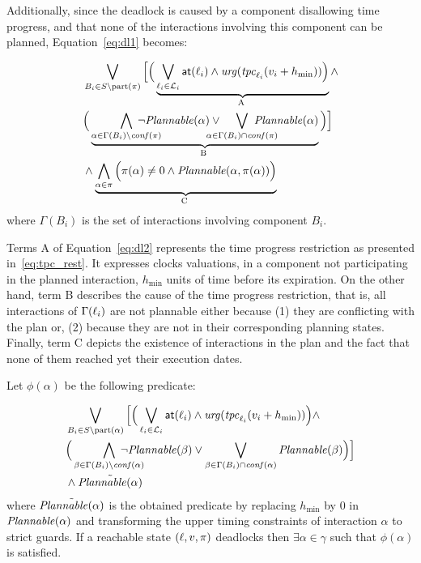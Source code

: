   Additionally, since the deadlock is caused by a component disallowing 
  time progress, and that none of the interactions involving this component
  can be planned, Equation~\ref{eq:dl1} becomes:
  
  \begin{equation}\label{eq:dl2}
  \begin{split}
    &\bigvee_{B_i\in S\setminus\p{\pi}}\Big[\Big(
    \underbrace{\bigvee_{\loc_i\in\Loc_i}\at{\loc_i}
  \wedge\urg(\tpc{\loc_i}(\val_i+h_{\min}))\Big)}_\text{\mytag{A}{A}}\wedge\\
  &\Big(\underbrace{\bigwedge_{\alpha\in\Gamma(B_i)\setminus\confl(\pi)}\hspace{-8mm}
    \neg\plntxt{\alpha}\vee\hspace{-5mm}\bigvee_{\alpha\in\Gamma(B_i)\cap\confl(\pi)}
\hspace{-8mm}\plntxt{\alpha}}_\text{\mytag{B}{B}}\Big)\Big]\\
&\wedge\underbrace{\bigwedge_{\alpha\in\pi}\Big(\pi(\alpha)\neq0\wedge
    \plnIntxt{\alpha}{\pi(\alpha)}\Big)}_\text{\mytag{C}{C}} 
  \end{split}
  \end{equation}
  where $\Gamma(B_i)$ is the set of interactions involving component $B_i$.

Terms A of Equation~\ref{eq:dl2} represents the time progress restriction as presented
in~\ref{eq:tpc_rest}. It expresses clocks valuations, in a component not participating 
in the planned interaction, $h_{\min}$ units of time before its expiration. On the other hand,
term B describes the cause of the time progress restriction, that is, all interactions
of $\Gamma(\ell_i)$ are not plannable either because (1) they are conflicting with the plan
or, (2) because they are not in their corresponding planning states.
Finally, term C depicts the existence of interactions in the plan and the fact that none of them
reached yet their execution dates.
 
\begin{theorem}\label{thm:dla}
  Let $\phi(\alpha)$ be the following predicate:

    \begin{equation}\label{eq:dla}
  \begin{split}
    &\bigvee_{B_i\in S\setminus\p{\alpha}}\Big[\Big(
    \bigvee_{\loc_i\in\Loc_i}\at{\loc_i}
  \wedge\urg(\tpc{\loc_i}(\val_i+h_{\min}))\Big)\wedge\\
  &\Big(\bigwedge_{\beta\in\Gamma(B_i)\setminus\confl(\alpha)}\hspace{-8mm}
  \neg\plntxt{\beta}\vee\bigvee_{\beta\in\Gamma(B_i)\cap\confl(\alpha)}
\plntxt{\beta}\Big)\Big]\\
&\wedge\tilde{\plntxt{\alpha}} 
  \end{split}
\end{equation}
  where $\tilde{\mathit{Plannable(\alpha)}}$ is the obtained predicate by replacing 
  $h_{\min}$ by 0 in $\mathit{Plannable(\alpha)}$ and transforming the upper 
  timing constraints of interaction $\alpha$ to strict guards.
  If a reachable state $(\ell,v,\pi)$ deadlocks then $\exists\alpha\in\gamma$ 
  such that $\phi(\alpha)$ is satisfied.
\end{theorem}

